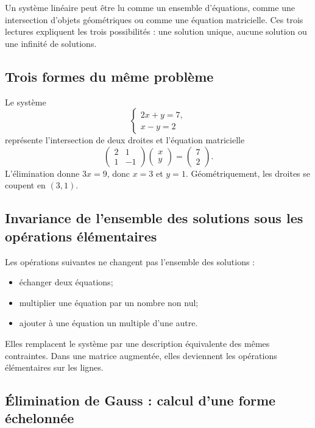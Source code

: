 \documentclass[12pt,a4paper,openany]{book}
\begin{document}
Un système linéaire peut être lu comme un ensemble d'équations, comme une intersection d'objets géométriques ou comme une équation matricielle. Ces trois lectures expliquent les trois possibilités : une solution unique, aucune solution ou une infinité de solutions.

\subsection{Trois formes du même problème}

Le système
\[
\begin{cases}
2x+y=7,\\
x-y=2
\end{cases}
\]
représente l'intersection de deux droites et l'équation matricielle
\[
\begin{pmatrix}2&1\\1&-1\end{pmatrix}
\begin{pmatrix}x\\y\end{pmatrix}
=
\begin{pmatrix}7\\2\end{pmatrix}.
\]
L'élimination donne $3x=9$, donc $x=3$ et $y=1$. Géométriquement, les droites se coupent en $(3,1)$.

\subsection{Invariance de l'ensemble des solutions sous les opérations élémentaires}

Les opérations suivantes ne changent pas l'ensemble des solutions :
\begin{itemize}
\item échanger deux équations;
\item multiplier une équation par un nombre non nul;
\item ajouter à une équation un multiple d'une autre.
\end{itemize}
Elles remplacent le système par une description équivalente des mêmes contraintes. Dans une matrice augmentée, elles deviennent les opérations élémentaires sur les lignes.

\subsection{Élimination de Gauss : calcul d'une forme échelonnée}
\end{document}
